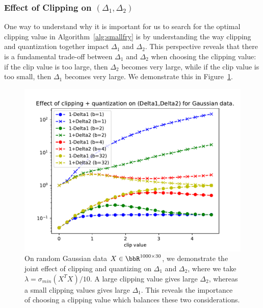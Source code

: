 \subsubsection{Effect of Clipping on $(\Delta_1,\Delta_2)$}
\label{sec:theory_clipping}
One way to understand why it is important for us to search for the optimal clipping value in Algorithm~\ref{alg:smallfry} is by understanding the way clipping and quantization together impact $\Delta_1$ and $\Delta_2$.
This perspective reveals that there is a fundamental trade-off between $\Delta_1$ and $\Delta_2$ when choosing the clipping value:
if the clip value is too large, then $\Delta_2$ becomes very large, while if the clip value is too small, then $\Delta_1$ becomes very large.
We demonstrate this in Figure~\ref{fig:deltas_vs_clip_quant}.
\begin{figure}
	\begin{center}
		\centerline{\includegraphics[width=0.8\columnwidth]{figures/deltas_vs_clip_and_quant.pdf}}
		\caption{On random Gaussian data $X \in \RR^{1000\times 30}$, we demonstrate the joint effect of clipping and quantizing on $\Delta_1$ and $\Delta_2$, where we take $\lambda = \sigma_{min}(X^T X)/10$.
		A large clipping value gives large $\Delta_2$, whereas a small clipping values gives large $\Delta_1$.
		This reveals the importance of choosing a clipping value which balances these two considerations.
		}
		\label{fig:deltas_vs_clip_quant}
	\end{center}
\end{figure}

